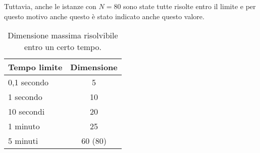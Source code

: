 Tuttavia, anche le istanze con $N=80$ sono state tutte risolte entro il limite e per questo motivo anche questo
è stato indicato anche questo valore.
%
\begin{table}[!h]
	\centering
	\begin{tabular}{l|c}\hline
	\textbf{Tempo limite} & \textbf{Dimensione}  \\ \hline
	0,1 secondo & 5 \\ \hline
	1 secondo & 10  \\ \hline
	10 secondi & 20  \\ \hline
	1 minuto & 25  \\ \hline
	5 minuti & 60 (80)  \\ \hline
	\end{tabular}
	\caption{Dimensione massima risolvibile entro un certo tempo.}
	\label{tab:intervalli-tempo-cplex}
\end{table}
%
